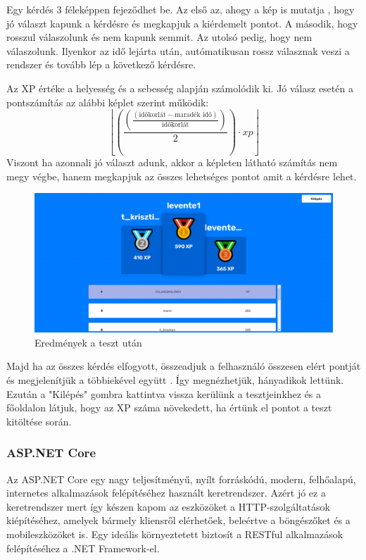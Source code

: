 Egy kérdés 3 féleképpen fejeződhet be. Az első az, ahogy a kép is mutatja , hogy jó választ kapunk a kérdésre és megkapjuk a kiérdemelt pontot. A második, hogy rosszul válaszolunk és nem kapunk semmit. Az utolsó pedig, hogy nem válaszolunk. Ilyenkor az idő lejárta után, autómatikusan rossz válasznak veszi a rendszer és tovább lép a következő kérdésre. \newline

Az XP értéke a helyesség és a sebesség alapján számolódik ki.
Jó válasz esetén a pontszámítás az alábbi képlet szerint működik:
\[ \left\lfloor\left(\frac{\left(\frac{\left( \text{időkorlát} - \text{maradék idő}\right)}{ \text{időkorlát}}\right)}{2}\right)\cdot xp\right\rfloor \]
Viszont ha azonnali jó választ adunk, akkor a képleten látható számítás nem megy végbe, hanem megkapjuk az összes lehetséges pontot amit a kérdésre lehet.

\begin{figure}[H]
    \centering
    \includegraphics[width=\linewidth]{images/results.png}
    \caption{Eredmények a teszt után}
    \label{fig:results}
\end{figure}

Majd ha az összes kérdés elfogyott, összeadjuk a felhasználó összesen elért pontját és megjelenítjük a többiekével együtt . Így megnézhetjük, hányadikok lettünk. Ezután a "Kilépés" gombra kattintva vissza kerülünk a tesztjeinkhez és a főoldalon látjuk, hogy az XP száma növekedett, ha értünk el pontot a teszt kitöltése során.


\subsubsection{ASP.NET Core}

Az ASP.NET Core egy nagy teljesítményű, nyílt forráskódú, modern, felhőalapú, internetes alkalmazások felépítéséhez használt keretrendszer. Azért jó ez a keretrendszer mert így készen kapom az eszközöket a HTTP-szolgáltatások kiépítéséhez, amelyek bármely kliensről elérhetőek, beleértve a böngészőket és a mobileszközöket is. Egy ideális környeztetett biztosít a RESTful alkalmazások felépítéséhez a .NET Framework-el. \newline

